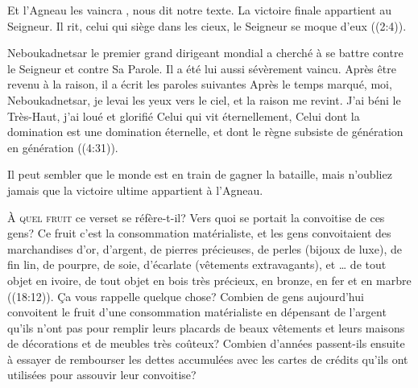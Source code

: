 \Og Et l'Agneau les vaincra \Fg{}, 
 nous dit notre texte. La victoire finale appartient au Seigneur.
 \Og Il rit, celui qui siège dans les cieux, le Seigneur se moque d'eux \Fg{}
 ((2:4)).


Neboukadnetsar \ocadr le premier grand dirigeant mondial \fcadr{}
 a cherché à se battre contre le Seigneur et contre Sa Parole.
 Il a été lui aussi sévèrement vaincu. Après être revenu à la raison,
 il a écrit les paroles suivantes\frcolon{}
 \Og Après le temps marqué, moi, Neboukadnetsar,
 je levai les yeux vers le ciel, et la raison me revint.
 J'ai béni le Très-Haut, j'ai loué et glorifié Celui qui vit éternellement,
 Celui dont la domination est une domination éternelle,
 et dont le règne subsiste de génération en génération \Fg{}
 ((4:31)).

Il peut sembler que le monde est en train de gagner la bataille,
 mais n'oubliez jamais que la victoire ultime appartient à l'Agneau.

\dvrule






\lettrine{À}{ quel fruit} ce verset se réfère-t-il?
 Vers quoi se portait la convoitise de ces gens?
 Ce fruit c'est la consommation matérialiste, et les gens convoitaient
 \Og des marchandises d'or, d'argent, de pierres précieuses, de perles \Fg{}
 (bijoux de luxe), \Og de fin lin, de pourpre, de soie, d'écarlate \Fg{}
 (vêtements extravagants), et \Og \dots{} de tout objet en ivoire,
 de tout objet en bois très précieux, en bronze, en fer et en marbre \Fg{}
 ((18:12)).
 Ça vous rappelle quelque chose? Combien de gens aujourd'hui convoitent
 le fruit d'une consommation matérialiste en dépensant de l'argent
 qu'ils n'ont pas pour remplir leurs placards de beaux vêtements
 et leurs maisons de décorations et de meubles très coûteux?
 Combien d'années passent-ils ensuite à essayer de rembourser
 les dettes accumulées avec les cartes de crédits
 qu'ils ont utilisées pour assouvir leur convoitise?

